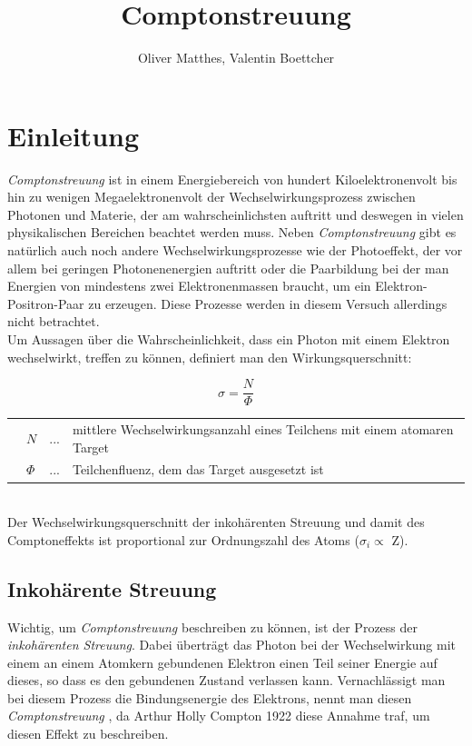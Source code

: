 \documentclass[slug=CS, room=Andreas-Schubert-Bau\,\ Labor\ 406,
supervisor=Juliane\ Volkmer, coursedate=29.\ 11.\ 2019]{../../Lab_Report_LaTeX/lab_report}
\title{Comptonstreuung}
\author{Oliver Matthes, Valentin Boettcher}
\newcommand{\cs}{\emph{Comptonstreuung }}
\begin{document}
\maketitle

\section{Einleitung}
\label{sec:einl}

\cs ist in einem Energiebereich von hundert Kiloelektronenvolt bis hin zu wenigen
Megaelektronenvolt der Wechselwirkungsprozess zwischen Photonen und Materie, der am
 wahrscheinlichsten auftritt und deswegen in vielen physikalischen Bereichen beachtet werden muss.
Neben \cs gibt es natürlich auch noch andere Wechselwirkungsprozesse wie der
Photoeffekt, der vor allem bei geringen Photonenenergien auftritt oder die Paarbildung bei
der man Energien von mindestens zwei Elektronenmassen braucht, um ein Elektron-Positron-Paar
zu erzeugen. Diese Prozesse werden in diesem Versuch allerdings nicht betrachtet.\\

Um Aussagen über die Wahrscheinlichkeit, dass ein Photon mit einem Elektron wechselwirkt,
treffen zu können, definiert man den Wirkungsquerschnitt:

\begin{equation}\label{eq:wirkquer}
	\sigma = \frac{N}{\Phi}
\end{equation}

\begin{tabular}{llll}
	 & \(N\)    & ... & mittlere Wechselwirkungsanzahl eines Teilchens mit einem atomaren Target \\
	 & \(\Phi\) & ... & Teilchenfluenz, dem das Target ausgesetzt ist
\end{tabular}\\

Der Wechselwirkungsquerschnitt der inkohärenten Streuung und damit des Comptoneffekts ist
proportional zur Ordnungszahl des Atoms (\(\sigma_i \propto\) Z).\\

\subsection{Inkohärente Streuung}
\label{sec:inkostreu}

Wichtig, um \cs beschreiben zu können, ist der Prozess der \emph{inkohärenten Streuung}.
Dabei überträgt das Photon bei der Wechselwirkung mit einem an einem Atomkern gebundenen
Elektron einen Teil seiner Energie auf dieses, so dass es den gebundenen Zustand verlassen kann.
Vernachlässigt man bei diesem Prozess die Bindungsenergie des Elektrons, nennt man diesen \cs,
da Arthur Holly Compton 1922 diese Annahme traf, um diesen Effekt zu beschreiben.\\
\end{document}
